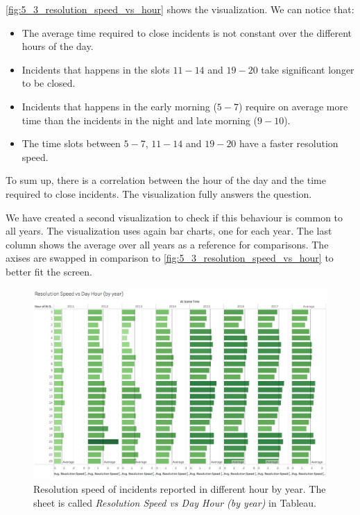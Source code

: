 \cref{fig:5_3_resolution_speed_vs_hour} shows the visualization.
We can notice that:
\begin{itemize}
    \item The average time required to close incidents is not constant over the different hours of the day.
    \item Incidents that happens in the slots $11 - 14$ and $19 - 20$ take significant longer to be closed.
    \item Incidents that happens in the early morning ($5 - 7$) require on average more time than the incidents in the night and late morning ($9 - 10$).
    \item The time slots between $5 - 7$, $11 - 14$ and $19 - 20$ have a faster resolution speed.
\end{itemize}

To sum up, there is a correlation between the hour of the day and the time required to close incidents.
The visualization fully answers the question.

We have created a second visualization to check if this behaviour is common to all years.
The visualization uses again bar charts, one for each year.
The last column shows the average over all years as a reference for comparisons.
The axises are swapped in comparison to \cref{fig:5_3_resolution_speed_vs_hour} to better fit the screen.

\begin{figure}[h]
	\centering
	\includegraphics[width=0.9\columnwidth]{figures/5_3_resolution_speed_vs_hour_by_year}
	\caption{Resolution speed of incidents reported in different hour by year. The sheet is called \textit{Resolution Speed vs Day Hour (by year)} in Tableau.}
	\label{fig:5_3_resolution_speed_vs_hour_by_year}
\end{figure}

